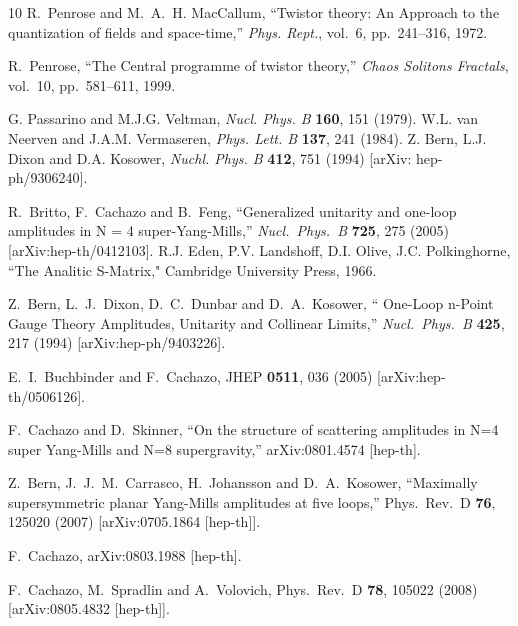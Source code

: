 \documentclass[12pt]{article}
\begin{document}
\begin{thebibliography}{10}
R.~Penrose and M.~A.~H. MacCallum, ``{Twistor theory: An Approach to the
  quantization of fields and space-time},'' {\em Phys. Rept.}, vol.~6,
  pp.~241--316, 1972.

R.~Penrose, ``{The Central programme of twistor theory},'' {\em Chaos Solitons
  Fractals}, vol.~10, pp.~581--611, 1999.

G. Passarino and M.J.G. Veltman, {\em Nucl. Phys. B} {\bf 160}, 151 (1979). W.L. van Neerven and J.A.M. Vermaseren, {\em Phys. Lett. B} {\bf 137}, 241 (1984). Z. Bern, L.J. Dixon and D.A. Kosower, {\em Nuchl. Phys. B} {\bf 412}, 751 (1994) [arXiv: hep-ph/9306240].

R.~Britto, F.~Cachazo and B.~Feng,
  ``{Generalized unitarity and one-loop amplitudes in N = 4  super-Yang-Mills},''
  {\em Nucl.\ Phys.\  B} {\bf 725}, 275 (2005)
  [arXiv:hep-th/0412103]. R.J. Eden, P.V. Landshoff, D.I. Olive, J.C. Polkinghorne, ``{The Analitic S-Matrix}," Cambridge University Press, 1966.


  Z.~Bern, L.~J.~Dixon, D.~C.~Dunbar and D.~A.~Kosower,
  ``{ One-Loop n-Point Gauge Theory Amplitudes, Unitarity and Collinear Limits},''
  {\em Nucl.\ Phys.\  B} {\bf 425}, 217 (1994)
  [arXiv:hep-ph/9403226].

 E.~I.~Buchbinder and F.~Cachazo,
  JHEP {\bf 0511}, 036 (2005)
  [arXiv:hep-th/0506126].


  F.~Cachazo and D.~Skinner,
  ``{On the structure of scattering amplitudes in N=4 super Yang-Mills and N=8
  supergravity},''
  arXiv:0801.4574 [hep-th].

  Z.~Bern, J.~J.~M.~Carrasco, H.~Johansson and D.~A.~Kosower,
  ``Maximally supersymmetric planar Yang-Mills amplitudes at five loops,''
  Phys.\ Rev.\  D {\bf 76}, 125020 (2007)
  [arXiv:0705.1864 [hep-th]].


  F.~Cachazo,
  arXiv:0803.1988 [hep-th].

 F.~Cachazo, M.~Spradlin and A.~Volovich,
  Phys.\ Rev.\  D {\bf 78}, 105022 (2008)
  [arXiv:0805.4832 [hep-th]].


\end{thebibliography}
\end{document}
